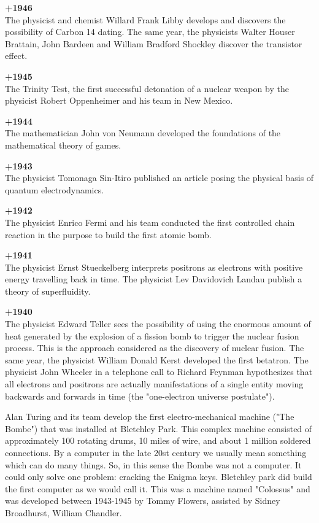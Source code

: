 \textbf{+1946}\\
The physicist and chemist Willard Frank Libby develops and discovers the possibility of Carbon 14 dating. The same year, the physicists Walter Houser Brattain, John Bardeen and William Bradford Shockley discover the transistor effect.

\textbf{+1945}\\
The Trinity Test, the first successful detonation of a nuclear weapon by the physicist Robert Oppenheimer and his team in New Mexico.

\textbf{+1944}\\
The mathematician John von Neumann developed the foundations of the mathematical theory of games.

\textbf{+1943}\\
The physicist Tomonaga Sin-Itiro published an article posing the physical basis of quantum electrodynamics.

\textbf{+1942}\\
The physicist Enrico Fermi and his team conducted the first controlled chain reaction in the purpose to build the first atomic bomb.

\textbf{+1941}\\
The physicist Ernst Stueckelberg interprets positrons as electrons with positive energy travelling back in time. The physicist Lev Davidovich Landau publish a theory of superfluidity.

\textbf{+1940}\\
The physicist Edward Teller sees the possibility of using the enormous amount of heat generated by the explosion of a fission bomb to trigger the nuclear fusion process. This is the approach considered as the discovery of nuclear fusion. The same year, the physicist William Donald Kerst developed the first betatron. The physicist John Wheeler in a telephone call to Richard Feynman hypothesizes that all electrons and positrons are actually manifestations of a single entity moving backwards and forwards in time (the "one-electron universe postulate").

Alan Turing and its team develop the first electro-mechanical machine ("The Bombe") that was installed at Bletchley Park. This complex machine consisted of approximately 100 rotating drums, 10 miles of wire, and about 1 million soldered connections. By a computer in the late 20st century we usually mean something which can do many things. So, in this sense the Bombe was not a computer. It could only solve one problem: cracking the Enigma keys. Bletchley park did build the first computer as we would call it. This was a machine named "Colossus" and was developed between 1943-1945 by Tommy Flowers, assisted by Sidney Broadhurst, William Chandler.


